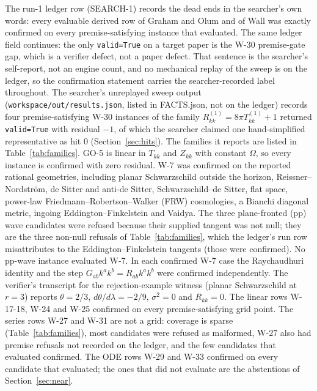 \documentclass[11pt]{article}
\begin{document}
The run-1 ledger row (SEARCH-1) records the dead ends in the searcher's own words: every evaluable derived row of Graham and Olum and of Wall was exactly confirmed on every premise-satisfying instance that evaluated. The same ledger field continues: the only \texttt{valid=True} on a target paper is the W-30 premise-gate gap, which is a verifier defect, not a paper defect. That sentence is the searcher's self-report, not an engine count, and no mechanical replay of the sweep is on the ledger, so the confirmation statement carries the searcher-recorded label throughout. The searcher's unreplayed sweep output (\texttt{workspace/out/results.json}, listed in FACTS.json, not on the ledger) records four premise-satisfying W-30 instances of the family $R^{(1)}_{kk} = 8\pi T^{(1)}_{kk} + 1$ returned \texttt{valid=True} with residual $-1$, of which the searcher claimed one hand-simplified representative as hit 0 (Section~\ref{sec:hits}). The families it reports are listed in Table~\ref{tab:families}. GO-5 is linear in $T_{kk}$ and $Z_{kk}$ with constant $\Omega$, so every instance is confirmed with zero residual. W-7 was confirmed on the reported rational geometries, including planar Schwarzschild outside the horizon, Reissner--Nordstr\"om, de Sitter and anti-de Sitter, Schwarzschild--de Sitter, flat space, power-law Friedmann--Robertson--Walker (FRW) cosmologies, a Bianchi diagonal metric, ingoing Eddington--Finkelstein and Vaidya. The three plane-fronted (pp) wave candidates were refused because their supplied tangent was not null; they are the three non-null refusals of Table~\ref{tab:families}, which the ledger's run row misattributes to the Eddington--Finkelstein tangents (those were confirmed). No pp-wave instance evaluated W-7. In each confirmed W-7 case the Raychaudhuri identity and the step $G_{ab}k^ak^b = R_{ab}k^ak^b$ were confirmed independently. The verifier's transcript for the rejection-example witness (planar Schwarzschild at $r=3$) reports $\theta = 2/3$, $d\theta/d\lambda = -2/9$, $\sigma^2 = 0$ and $R_{kk} = 0$. The linear rows W-17-18, W-24 and W-25 confirmed on every premise-satisfying grid point. The series rows W-27 and W-31 are not a grid: coverage is sparse (Table~\ref{tab:families}), most candidates were refused as malformed, W-27 also had premise refusals not recorded on the ledger, and the few candidates that evaluated confirmed. The ODE rows W-29 and W-33 confirmed on every candidate that evaluated; the ones that did not evaluate are the abstentions of Section~\ref{sec:near}.
\end{document}
